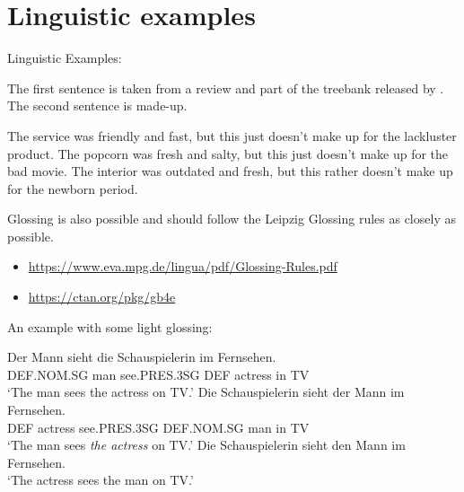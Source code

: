 \section{Linguistic examples}

Linguistic Examples:

The first sentence is taken from a review and part of the treebank released by \cite{silveira-etal-2014-gold}. 
The second sentence is made-up. 

\begin{exe}
    \ex \label{ex:intro} \begin{xlist} 
        \ex \label{ex:intro-orig} The service was friendly and fast, but this just doesn't make up for the lackluster product.
        \ex \label{ex:intro-madeup} The popcorn was fresh and salty, but this just doesn't make up for the bad movie.
        \ex \label{ex:intro-nonce} The interior was outdated and fresh, but this rather doesn't make up for the newborn period.
    \end{xlist}
\end{exe}

Glossing is also possible and should follow the Leipzig Glossing rules as closely as possible.

\begin{itemize}
    \item \url{https://www.eva.mpg.de/lingua/pdf/Glossing-Rules.pdf}
    \item \url{https://ctan.org/pkg/gb4e}
\end{itemize}

An example with some light glossing: 

\begin{exe}
    \ex \label{ex:man-sees-actress} \begin{xlist}
        \ex \label{ex:man-see-actress-a} \gll Der Mann sieht die Schauspielerin im Fernsehen.\\
        DEF.NOM.SG man see.PRES.3SG DEF actress in TV\\
        `The man sees the actress on TV.'
        \ex \label{ex:man-see-actress-b} \gll Die Schauspielerin sieht der Mann im Fernsehen.\\
        DEF actress see.PRES.3SG DEF.NOM.SG man in TV\\
        `The man sees \textit{the actress} on TV.'
        \ex \label{ex:man-see-actress-c} Die Schauspielerin sieht den Mann im Fernsehen.\\
        `The actress sees the man on TV.'
    \end{xlist}
\end{exe}


